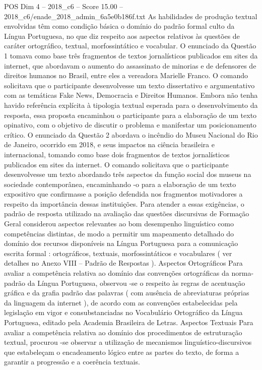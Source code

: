 \begin{textsample}{POS Dim 4 – 2018\_c6 – Score 15.00 – 2018\_c6/enade\_2018\_admin\_6a5e0b186f.txt}
As habilidades de produção textual envolvidas têm como condição básica o domínio do padrão formal culto da Língua Portuguesa, no que diz respeito aos aspectos relativos às questões de caráter ortográfico, textual, morfossintático e vocabular.
O enunciado da Questão 1 tomava como base três fragmentos de textos jornalísticos publicados em sites da internet, que abordavam o aumento do assassinato de minorias e de defensores de direitos humanos no Brasil, entre eles a vereadora Marielle Franco.
O comando solicitava que o participante desenvolvesse um texto dissertativo e argumentativo com as temáticas Fake News, Democracia e Direitos Humanos.
Embora não tenha havido referência explícita à tipologia textual esperada para o desenvolvimento da resposta, essa proposta encaminhou o participante para a elaboração de um texto opinativo, com o objetivo de discutir o problema e manifestar um posicionamento crítico.
O enunciado da Questão 2 abordava o incêndio do Museu Nacional do Rio de Janeiro, ocorrido em 2018, e seus impactos na ciência brasileira e internacional, tomando como base dois fragmentos de textos jornalísticos publicados em sites da internet.
O comando solicitava que o participante desenvolvesse um texto abordando três aspectos da função social dos museus na sociedade contemporânea, encaminhando -o para a elaboração de um texto expositivo que confirmasse a posição defendida nos fragmentos motivadores a respeito da importância dessas instituições.
Para atender a essas exigências, o padrão de resposta utilizado na avaliação das questões discursivas de Formação Geral considerou aspectos relevantes ao bom desempenho linguístico como competências distintas, de modo a permitir um mapeamento detalhado do domínio dos recursos disponíveis na Língua Portuguesa para a comunicação escrita formal : ortográficos, textuais, morfossintáticos e vocabulares ( ver detalhes no Anexo VIII – Padrão de Respostas ).
Aspectos Ortográficos Para avaliar a competência relativa ao domínio das convenções ortográficas da norma-padrão da Língua Portuguesa, observou -se o respeito às regras de acentuação gráfica e da grafia padrão das palavras ( com ausência de abreviaturas próprias da linguagem da internet ), de acordo com as convenções estabelecidas pela legislação em vigor e consubstanciadas no Vocabulário Ortográfico da Língua Portuguesa, editado pela Academia Brasileira de Letras.
Aspectos Textuais Para avaliar a competência relativa ao domínio dos procedimentos de estruturação textual, procurou -se observar a utilização de mecanismos linguístico-discursivos que estabeleçam o encadeamento lógico entre as partes do texto, de forma a garantir a progressão e a coerência textuais.

\end{textsample}
